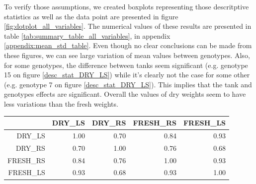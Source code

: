 To verify those assumptions, we created boxplots representing those descritptive statistics as well as the data point are presented in figure \ref{fig:dotplot_all_variables}. The numerical values of these results are presented in table \ref{tab:summary_table_all_variables}, in appendix \ref{appendix:mean_std_table}.
Even though no clear conclusions can be made from these figures, we can see large variation of mean values between genotypes. Also, for some genotypes, the difference between tanks seem significant (e.g. genotype 15 on figure \ref{desc_stat_DRY_LS}) while it's clearly not the case for some other (e.g. genotype 7 on figure \ref{desc_stat_DRY_LS}). This implies that the tank and genotypes effects are significant. Overall the values of dry weights seem to have less variations than the fresh weights.

\begin{table}[ht]
\centering
\begin{tabular}{rrrrr}
  \hline
 & DRY\_LS & DRY\_RS & FRESH\_RS & FRESH\_LS \\ 
  \hline
DRY\_LS & 1.00 & 0.70 & 0.84 & 0.93 \\ 
  DRY\_RS & 0.70 & 1.00 & 0.76 & 0.68 \\ 
  FRESH\_RS & 0.84 & 0.76 & 1.00 & 0.93 \\ 
  FRESH\_LS & 0.93 & 0.68 & 0.93 & 1.00 \\ 
   \hline
\end{tabular}
\end{table}

